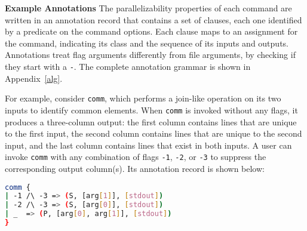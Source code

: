 \documentclass[letterpaper,twocolumn,10pt]{article}
\newcommand{\heading}[1]{\vspace{4pt}\noindent\textbf{#1}\enspace}
\newcommand{\ttt}[1]{\texttt{#1}}
\newcommand{\cn}[1]{\mbox{\textcircled{\footnotesize #1}}}
\newcommand{\sta}{\cn{\textsc{S}}\xspace}
\newcommand{\pur}{\cn{\textsc{P}}\xspace}
\newcommand{\nv}[1]{[{\color{cyan}nv: #1}]}
\begin{document}



\heading{Example Annotations}
The parallelizability properties of each command are written in an annotation record that
contains a set of clauses, each one identified by a predicate on the command options.
Each clause maps to an assignment for the command, indicating its class and the sequence of its inputs and outputs.
Annotations treat flag arguments differently from file arguments, by checking if they start with a \ttt{-}.
The complete annotation grammar is shown in Appendix~\ref{alg}.

For example, consider \ttt{comm}, which performs a join-like operation on its two inputs to identify common elements.
When \ttt{comm} is invoked without any flags, it produces a three-column output:
  the first column contains lines that are unique to the first input, the second column contains lines that are unique to the second input, and the last column contains lines that exist in both inputs.
A user can invoke \ttt{comm} with any combination of flags \ttt{-1}, \ttt{-2}, or \ttt{-3} to suppress the corresponding output column(s).
Its annotation record is shown below:
%
\begin{lstlisting}[language=sh, numbers=none]
comm {
| -1 /\ -3 => (S, [arg[1]], [stdout])
| -2 /\ -3 => (S, [arg[0]], [stdout])
| _  => (P, [arg[0], arg[1]], [stdout])
}
\end{lstlisting}
\end{document}
